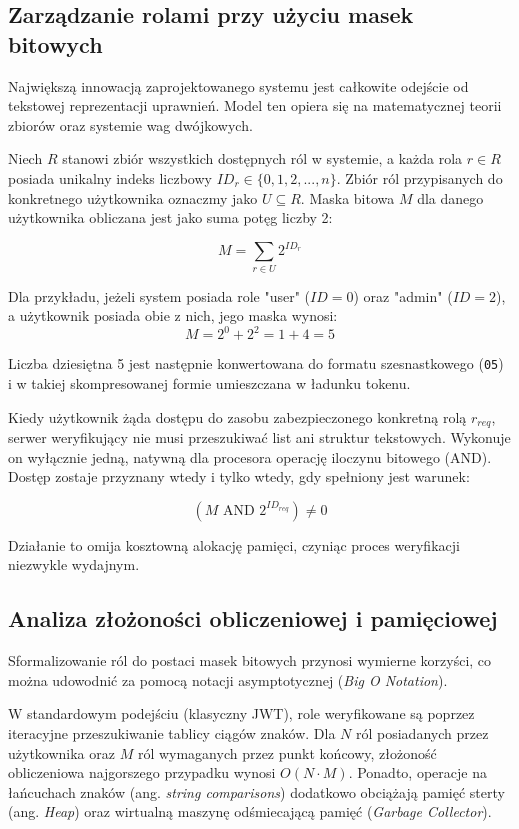 \documentclass{SGGW-thesis}
\begin{document}
\subsection{Zarządzanie rolami przy użyciu masek bitowych}

Największą innowacją zaprojektowanego systemu jest całkowite odejście od tekstowej reprezentacji uprawnień. Model ten opiera się na matematycznej teorii zbiorów oraz systemie wag dwójkowych.

Niech $R$ stanowi zbiór wszystkich dostępnych ról w systemie, a każda rola $r \in R$ posiada unikalny indeks liczbowy $ID_r \in \{0, 1, 2, ..., n\}$. Zbiór ról przypisanych do konkretnego użytkownika oznaczmy jako $U \subseteq R$. Maska bitowa $M$ dla danego użytkownika obliczana jest jako suma potęg liczby 2:

$$ M = \sum_{r \in U} 2^{ID_r} $$

Dla przykładu, jeżeli system posiada role "user" ($ID=0$) oraz "admin" ($ID=2$), a użytkownik posiada obie z nich, jego maska wynosi:
$$ M = 2^0 + 2^2 = 1 + 4 = 5 $$

Liczba dziesiętna 5 jest następnie konwertowana do formatu szesnastkowego (\texttt{05}) i w takiej skompresowanej formie umieszczana w ładunku tokenu.

Kiedy użytkownik żąda dostępu do zasobu zabezpieczonego konkretną rolą $r_{req}$, serwer weryfikujący nie musi przeszukiwać list ani struktur tekstowych. Wykonuje on wyłącznie jedną, natywną dla procesora operację iloczynu bitowego (AND). Dostęp zostaje przyznany wtedy i tylko wtedy, gdy spełniony jest warunek:

$$ (M \text{ AND } 2^{ID_{req}}) \neq 0 $$

Działanie to omija kosztowną alokację pamięci, czyniąc proces weryfikacji niezwykle wydajnym.

\subsection{Analiza złożoności obliczeniowej i pamięciowej}

Sformalizowanie ról do postaci masek bitowych przynosi wymierne korzyści, co można udowodnić za pomocą notacji asymptotycznej (\textit{Big O Notation}). 

W standardowym podejściu (klasyczny JWT), role weryfikowane są poprzez iteracyjne przeszukiwanie tablicy ciągów znaków. Dla $N$ ról posiadanych przez użytkownika oraz $M$ ról wymaganych przez punkt końcowy, złożoność obliczeniowa najgorszego przypadku wynosi $O(N \cdot M)$. Ponadto, operacje na łańcuchach znaków (ang. \textit{string comparisons}) dodatkowo obciążają pamięć sterty (ang. \textit{Heap}) oraz wirtualną maszynę odśmiecającą pamięć (\textit{Garbage Collector}).
\end{document}

